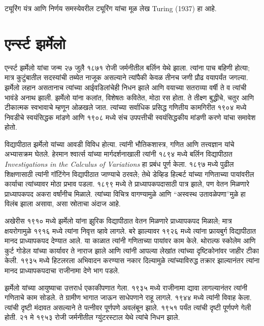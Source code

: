 ट्यूरिंग यंत्र आणि निर्णय समस्येवरील ट्यूरिंग यांचा मूळ लेख Turing (1937) हा आहे.














\section{एर्न्स्ट झर्मेलो}\label{his:bio:zer:sec}



एर्न्स्ट झर्मेलो यांचा जन्म २७ जुलै १८७१ रोजी जर्मनीतील बर्लिन येथे झाला. त्यांना पाच बहिणी होत्या; मात्र कुटुंबातील सदस्यांची तब्येत नाजूक असल्याने त्यांपैकी केवळ तीनच जणी प्रौढ वयापर्यंत जगल्या. झर्मेलो लहान असतानाच त्यांच्या आईवडिलांचेही निधन झाले आणि वयाच्या सतराव्या वर्षी ते व त्यांची भावंडे अनाथ झाली. झर्मेलो यांना कलांत, विशेषतः कवितेत, मोठा रस होता. ते तीक्ष्ण बुद्धीचे, चतुर आणि टीकात्मक स्वभावाचे म्हणून ओळखले जात. त्यांच्या सर्वाधिक प्रसिद्ध गणितीय कामगिरीत १९०४ मध्ये निवडीचे स्वयंसिद्धक मांडणे आणि १९०८ मध्ये संच उपपत्तीची स्वयंसिद्धकीय मांडणी करणे यांचा समावेश होतो.

विद्यापीठात झर्मेलो यांच्या आवडी विविध होत्या. त्यांनी भौतिकशास्त्र, गणित आणि तत्त्वज्ञान यांचे अभ्यासक्रम घेतले. हेरमान श्वार्त्स यांच्या मार्गदर्शनाखाली त्यांनी १८९४ मध्ये बर्लिन विद्यापीठात \emph{Investigations in
  the Calculus of Variations} हा प्रबंध पूर्ण केला. १८९७ मध्ये पुढील शिक्षणासाठी त्यांनी गॉटिंगेन विद्यापीठात जाण्याचे ठरवले; तेथे डेव्हिड हिल्बर्ट यांच्या गणिताच्या पायांवरील कार्याचा त्यांच्यावर मोठा प्रभाव पडला. १८९९ मध्ये ते प्राध्यापकपदासाठी पात्र झाले, पण वेतन मिळणारे प्राध्यापकपद अकरा वर्षांनीच मिळाले. त्यांच्या विचित्र वागण्यामुळे आणि “अस्वस्थ उतावळेपणा”मुळे हा विलंब झाला असावा, असा स्रोताचा अंदाज आहे.

अखेरीस १९१० मध्ये झर्मेलो यांना झुरिक विद्यापीठात वेतन मिळणारे प्राध्यापकपद मिळाले; मात्र क्षयरोगामुळे १९१६ मध्ये त्यांना निवृत्त व्हावे लागले. बरे झाल्यावर १९२६ मध्ये त्यांना फ्रायबुर्ग विद्यापीठात मानद प्राध्यापकपद देण्यात आले. या काळात त्यांनी गणिताच्या पायांवर काम केले. थोराल्फ स्कोलेम आणि कुर्ट गोडेल यांच्या कार्यावर ते नाराज झाले आणि त्यांनी आपल्या लेखांत त्यांच्या दृष्टिकोनांवर जाहीर टीका केली. १९३५ मध्ये हिटलरला अभिवादन करण्यास नकार दिल्यामुळे त्यांच्याविरुद्ध तक्रार झाल्यानंतर त्यांना मानद प्राध्यापकपदाचा राजीनामा देणे भाग पडले.

झर्मेलो यांच्या आयुष्याचा उत्तरार्ध एकाकीपणात गेला. १९३५ मध्ये राजीनामा द्यावा लागल्यानंतर त्यांनी गणिताचे काम सोडले. ते ग्रामीण भागात जाऊन साधेपणाने राहू लागले. १९४४ मध्ये त्यांनी विवाह केला. त्यांची दृष्टी मंदावत असल्याने ते पत्नीवर पूर्णपणे अवलंबून झाले. १९५१ पर्यंत त्यांची दृष्टी पूर्णपणे गेली होती. २१ मे १९५३ रोजी जर्मनीतील ग्युंटरस्टाल येथे त्यांचे निधन झाले.

